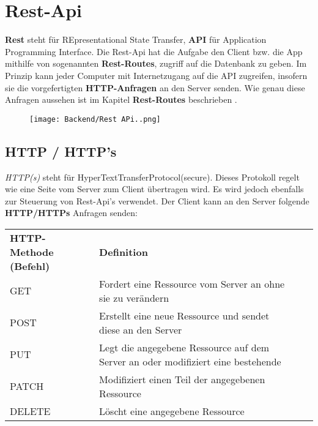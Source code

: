 \section{Rest-Api}
\label{restapi}

\textbf{Rest} steht für REpresentational State Transfer, \textbf{API} für Application
Programming Interface. Die Rest-Api hat die Aufgabe den Client bzw. die App
mithilfe von sogenannten \textbf{Rest-Routes}, zugriff auf die Datenbank zu geben.
Im Prinzip kann jeder Computer mit Internetzugang auf die API zugreifen, insofern
sie die vorgefertigten \textbf{HTTP-Anfragen} an den Server senden. Wie genau diese
Anfragen aussehen ist im Kapitel \textbf{Rest-Routes} beschrieben \underline{}.

\begin{figure}[H]
    \begin{center}
        \texttt{[image: Backend/Rest APi..png]}
    \end{center}
\end{figure}

\subsection{HTTP / HTTP's}
\textit{HTTP(s)} steht für HyperTextTransferProtocol(secure).
Dieses Protokoll regelt wie eine Seite vom Server zum Client übertragen wird.
Es wird jedoch ebenfalls zur Steuerung von Rest-Api's verwendet. Der Client
kann an den Server folgende \textbf{HTTP/HTTPs} Anfragen senden:

\begin{table}
    \centering
    \begin{tabular}{llll}
        \textbf{HTTP-Methode (Befehl)} & \textbf{Definition}                                                              &  & \\
        GET                            & Fordert eine Ressource vom Server an ohne sie zu verändern                       &  & \\
        POST                           & Erstellt eine neue Ressource und sendet diese an den Server                      &  & \\
        PUT                            & Legt die angegebene Ressource auf dem Server an oder modifiziert eine bestehende &  & \\
        PATCH                          & Modifiziert einen Teil der angegebenen Ressource                                 &  & \\
        DELETE                         & Löscht eine angegebene Ressource                                                 &  &
    \end{tabular}
\end{table}
